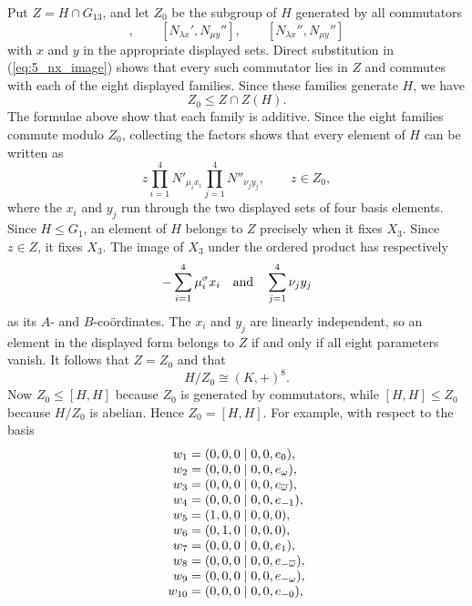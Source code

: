\documentclass{amsart}
\renewcommand{\bar}{\overline}
\newcommand{\s}{\sigma}
\theoremstyle{plain}
\numberwithin{theorem}{section}
\theoremstyle{definition}
\begin{document}
Put $Z=H\cap G_{13}$, and let $Z_0$ be the subgroup of $H$ generated by
all commutators
\begin{equation*}
	 [N_{\lambda x}',N_{\mu y}'],\qquad
	 [N_{\lambda x}',N_{\mu y}''],\qquad
	 [N_{\lambda x}'',N_{\mu y}'']
\end{equation*}
with $x$ and $y$ in the appropriate displayed sets.  Direct substitution
in (\ref{eq:5_nx_image}) shows that every such commutator lies in $Z$ and
commutes with each of the eight displayed families.  Since these families
generate $H$, we have
\begin{equation*}
	 Z_0\leqslant Z\cap Z(H).
\end{equation*}
The formulae above show that each family is additive.  Since the eight
families commute modulo $Z_0$, collecting the factors shows that every
element of $H$ can be written as
\begin{equation*}
	 z\prod_{i=1}^{4}N'_{\mu_i x_i}
	       \prod_{j=1}^{4}N''_{\nu_j y_j},
	 \qquad z\in Z_0,
\end{equation*}
where the $x_i$ and $y_j$ run through the two displayed sets of four
basis elements.  Since $H\leqslant G_1$, an element of $H$ belongs to
$Z$ precisely when it fixes $X_3$.  Since $z\in Z$, it fixes $X_3$.
The image of $X_3$ under the ordered product has respectively
\begin{equation*}
	 -\sum_{i=1}^{4}\mu_i^{\s}x_i
	 \quad\hbox{and}\quad
	 \sum_{j=1}^{4}\nu_jy_j
\end{equation*}
as its $A$- and $B$-co\"{o}rdinates.  The $x_i$ and $y_j$ are linearly
independent, so an element in the displayed form belongs to $Z$ if and
only if all eight parameters vanish.  It follows that $Z=Z_0$ and that
\begin{equation*}
	 H/Z_0\cong(K,+)^8.
\end{equation*}
Now $Z_0\leqslant[H,H]$ because $Z_0$ is generated by commutators, while
$[H,H]\leqslant Z_0$ because $H/Z_0$ is abelian.  Hence $Z_0=[H,H]$.
For example, with respect to the basis
\begin{equation}
	\begin{array}{r@{\;}c@{\;}l}
		w_1 & = & (0,0,0 \mid 0,0,e_0), \\
		w_2 & = & (0,0,0 \mid 0,0,e_{\omega}), \\
		w_3 & = & (0,0,0 \mid 0,0,e_{\bar{\omega}}), \\
		w_4 & = & (0,0,0 \mid 0,0,e_{-1}), \\
		w_5 & = & (1,0,0 \mid 0,0,0), \\
		w_6 & = & (0,1,0 \mid 0,0,0), \\
		w_7 & = & (0,0,0 \mid 0,0,e_1), \\
		w_8 & = & (0,0,0 \mid 0,0,e_{-\bar{\omega}}),\\ 
		w_9 & = & (0,0,0 \mid 0,0,e_{-\omega}), \\
		w_{10} & = & (0,0,0 \mid 0,0,e_{-0}), \\
	\end{array}
\end{equation}
\end{document}
